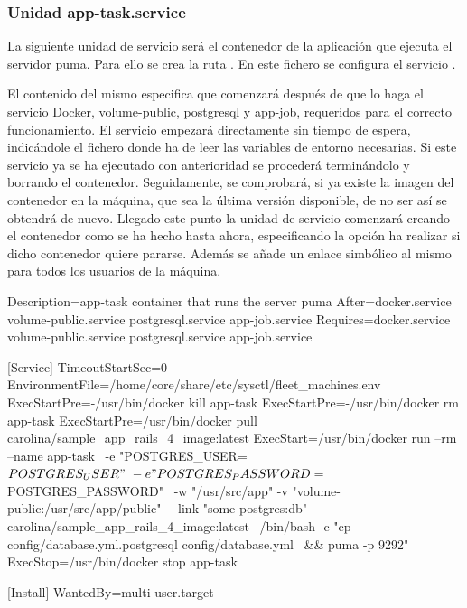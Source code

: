 \subsubsection{Unidad app-task.service}

La siguiente unidad de servicio será el contenedor de la aplicación que ejecuta el servidor puma. Para ello se crea la ruta . En este fichero se configura el servicio .

El contenido del mismo especifica que comenzará después de que lo haga el servicio Docker, volume-public, postgresql y app-job, requeridos para el correcto funcionamiento. El servicio empezará directamente sin tiempo de espera, indicándole el fichero donde ha de leer las variables de entorno necesarias. Si este servicio ya se ha ejecutado con anterioridad se procederá terminándolo y borrando el contenedor. Seguidamente, se comprobará, si ya existe la imagen del contenedor en la máquina, que sea la última versión disponible, de no ser así se obtendrá de nuevo. Llegado este punto la unidad de servicio comenzará creando el contenedor como se ha hecho hasta ahora, especificando la opción ha realizar si dicho contenedor quiere pararse. Además se añade un enlace simbólico al mismo para todos los usuarios de la máquina. 

\begin{codelisting}
\label{code:app-task.service}
\begin{code}
[Unit] 
  Description=app-task container that runs the server puma
  After=docker.service volume-public.service postgresql.service app-job.service
  Requires=docker.service volume-public.service postgresql.service app-job.service

[Service] 
  TimeoutStartSec=0 
  EnvironmentFile=/home/core/share/etc/sysctl/fleet_machines.env
  ExecStartPre=-/usr/bin/docker kill app-task 
  ExecStartPre=-/usr/bin/docker rm app-task
  ExecStartPre=/usr/bin/docker pull carolina/sample_app_rails_4_image:latest 
  ExecStart=/usr/bin/docker run --rm --name app-task \
  -e "POSTGRES_USER=${POSTGRES_USER}" \
  -e "POSTGRES_PASSWORD=${POSTGRES_PASSWORD}" \
  -w "/usr/src/app" -v "volume-public:/usr/src/app/public" \
  --link "some-postgres:db" carolina/sample_app_rails_4_image:latest \
  /bin/bash -c "cp config/database.yml.postgresql config/database.yml \
  && puma -p 9292"
  ExecStop=/usr/bin/docker stop app-task

[Install] 
  WantedBy=multi-user.target
\end{code}
\end{codelisting}


